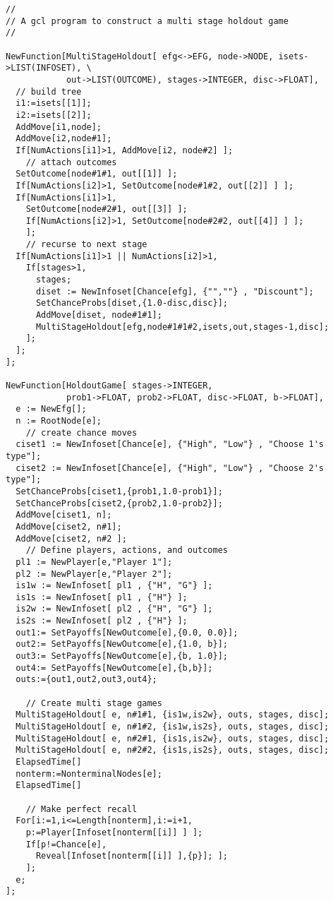 {\scriptsize 
\begin{verbatim}
//
// A gcl program to construct a multi stage holdout game
//

NewFunction[MultiStageHoldout[ efg<->EFG, node->NODE, isets->LIST(INFOSET), \
            out->LIST(OUTCOME), stages->INTEGER, disc->FLOAT],
  // build tree
  i1:=isets[[1]];
  i2:=isets[[2]];
  AddMove[i1,node];
  AddMove[i2,node#1];
  If[NumActions[i1]>1, AddMove[i2, node#2] ];
    // attach outcomes
  SetOutcome[node#1#1, out[[1]] ]; 
  If[NumActions[i2]>1, SetOutcome[node#1#2, out[[2]] ] ];
  If[NumActions[i1]>1, 
    SetOutcome[node#2#1, out[[3]] ];
    If[NumActions[i2]>1, SetOutcome[node#2#2, out[[4]] ] ];
    ];
    // recurse to next stage
  If[NumActions[i1]>1 || NumActions[i2]>1,
    If[stages>1,
      stages;
      diset := NewInfoset[Chance[efg], {"",""} , "Discount"];
      SetChanceProbs[diset,{1.0-disc,disc}];
      AddMove[diset, node#1#1];
      MultiStageHoldout[efg,node#1#1#2,isets,out,stages-1,disc];
    ];
  ];
];

NewFunction[HoldoutGame[ stages->INTEGER,
            prob1->FLOAT, prob2->FLOAT, disc->FLOAT, b->FLOAT],
  e := NewEfg[];
  n := RootNode[e];
    // create chance moves
  ciset1 := NewInfoset[Chance[e], {"High", "Low"} , "Choose 1's type"];
  ciset2 := NewInfoset[Chance[e], {"High", "Low"} , "Choose 2's type"];
  SetChanceProbs[ciset1,{prob1,1.0-prob1}];
  SetChanceProbs[ciset2,{prob2,1.0-prob2}];
  AddMove[ciset1, n];
  AddMove[ciset2, n#1];
  AddMove[ciset2, n#2 ];
    // Define players, actions, and outcomes
  pl1 := NewPlayer[e,"Player 1"];
  pl2 := NewPlayer[e,"Player 2"];
  is1w := NewInfoset[ pl1 , {"H", "G"} ];
  is1s := NewInfoset[ pl1 , {"H"} ];
  is2w := NewInfoset[ pl2 , {"H", "G"} ];
  is2s := NewInfoset[ pl2 , {"H"} ];
  out1:= SetPayoffs[NewOutcome[e],{0.0, 0.0}];
  out2:= SetPayoffs[NewOutcome[e],{1.0, b}];
  out3:= SetPayoffs[NewOutcome[e],{b, 1.0}];
  out4:= SetPayoffs[NewOutcome[e],{b,b}];
  outs:={out1,out2,out3,out4};

    // Create multi stage games
  MultiStageHoldout[ e, n#1#1, {is1w,is2w}, outs, stages, disc];
  MultiStageHoldout[ e, n#1#2, {is1w,is2s}, outs, stages, disc];
  MultiStageHoldout[ e, n#2#1, {is1s,is2w}, outs, stages, disc];
  MultiStageHoldout[ e, n#2#2, {is1s,is2s}, outs, stages, disc];
  ElapsedTime[]
  nonterm:=NonterminalNodes[e];
  ElapsedTime[]

    // Make perfect recall 
  For[i:=1,i<=Length[nonterm],i:=i+1,
    p:=Player[Infoset[nonterm[[i]] ] ];
    If[p!=Chance[e],
      Reveal[Infoset[nonterm[[i]] ],{p}]; ];
    ];	
  e;
];
\end{verbatim}
}

